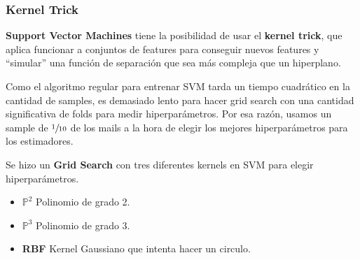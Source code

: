 \documentclass{article}
\begin{document}
\subsubsection{Kernel Trick}

\textbf{Support Vector Machines} tiene la posibilidad de usar el \textbf{kernel trick}, que aplica funcionar a conjuntos de features para conseguir nuevos features y ``simular'' una función de separación que sea más compleja que un hiperplano.

Como el algoritmo regular para entrenar SVM tarda un tiempo cuadrático en la cantidad de samples, es demasiado lento para hacer grid search con una cantidad significativa de folds para medir hiperparámetros. Por esa razón, usamos un sample de \(\sfrac{1}{10}\) de los mails a la hora de elegir los mejores hiperparámetros para los estimadores.

Se hizo un \textbf{Grid Search} con tres diferentes kernels en SVM para elegir hiperparámetros.

\begin{itemize}
	\item \textbf{\(\mathbb{P}^2\)} Polinomio de grado 2.
	\item \textbf{\(\mathbb{P}^3\)} Polinomio de grado 3.
	\item \textbf{RBF} Kernel Gaussiano que intenta hacer un circulo.
\end{itemize}
\end{document}
